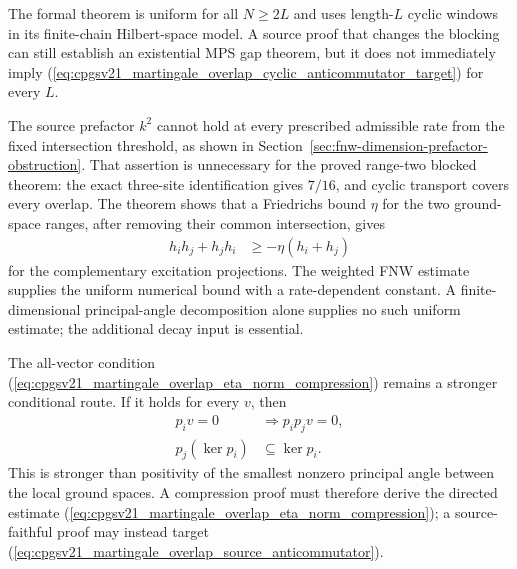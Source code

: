 \documentclass{article}
\begin{document}
The formal theorem is uniform for all $N\geq2L$ and uses length-$L$ cyclic
windows in its finite-chain Hilbert-space model. A source proof that changes
the blocking can still establish an existential MPS gap theorem, but it does
not immediately imply
(\ref{eq:cpgsv21_martingale_overlap_cyclic_anticommutator_target}) for every
$L$.

The source prefactor $k^2$ cannot hold at every prescribed admissible rate
from the fixed intersection threshold, as shown in
Section~\ref{sec:fnw-dimension-prefactor-obstruction}. That assertion is
unnecessary for the proved range-two blocked theorem: the exact
three-site identification gives $7/16$, and cyclic transport covers every
overlap. The theorem
shows that a Friedrichs bound $\eta$ for the two ground-space ranges, after
removing their common intersection, gives
\begin{align}
    h_ih_j+h_jh_i
     & \geq-\eta(h_i+h_j)
    \label{eq:cpgsv21_martingale_overlap_friedrichs_anticommutator}
\end{align}
for the complementary excitation projections. The weighted FNW estimate
supplies the uniform numerical bound with a rate-dependent constant. A
finite-dimensional principal-angle decomposition alone supplies no such
uniform estimate; the additional decay input is essential.

The all-vector condition
(\ref{eq:cpgsv21_martingale_overlap_eta_norm_compression}) remains a stronger
conditional route. If it holds for every $v$, then
\begin{align}
    p_iv=0
     & \Longrightarrow p_ip_jv=0,
    \label{eq:cpgsv21_martingale_overlap_compression_kernel_implication} \\
    p_j(\ker p_i)
     & \subseteq\ker p_i.
    \label{eq:cpgsv21_martingale_overlap_compression_kernel_preservation}
\end{align}
This is stronger than positivity of the smallest nonzero principal angle
between the local ground spaces. A compression proof must therefore derive the
directed estimate
(\ref{eq:cpgsv21_martingale_overlap_eta_norm_compression}); a source-faithful
proof may instead target
(\ref{eq:cpgsv21_martingale_overlap_source_anticommutator}).
\end{document}

